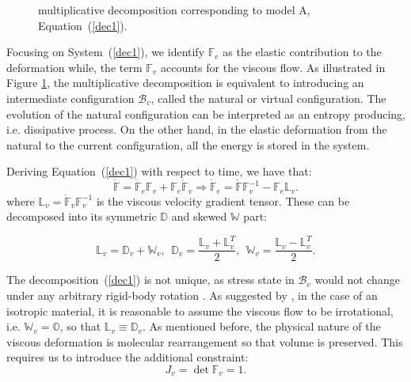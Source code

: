 \documentclass[runningheads]{llncs}
\newcommand{\F}{\ensuremath{\mathbb{F}}}
\newcommand{\LL}{\ensuremath{\mathbb{L}}}
\begin{document}
\begin{figure}[h!]
	\centering
	\hspace{20mm}
	\Large
	\def\svgwidth{0.5\linewidth}
	\caption{multiplicative decomposition corresponding to model A, Equation~(\ref{dec1}).}
\label{Model2}
\end{figure}

Focusing on System~(\ref{dec1}), we identify $\F_e$ as the elastic contribution to the deformation while, the term $\F_v$ accounts for the viscous flow. As illustrated in Figure \ref{Model2}, the multiplicative decomposition is equivalent to introducing an intermediate configuration $\mathcal{B}_v$, called the natural or virtual configuration. The evolution of the natural configuration can be interpreted as an entropy producing, i.e. dissipative process. On the other hand, in the elastic deformation from the natural to the current configuration, all the energy is stored in the system. 

Deriving Equation~(\ref{dec1}) with respect to time, we have that:
\begin{equation}
\dot{\F}=\dot{\F}_e\F_v+\F_e\dot{\F}_v \Longrightarrow \dot{\F}_e=\dot{\F}\F_v^{-1}-\F_e \LL_v. \label{lv}
\end{equation}
where $\LL_v=\dot{\F}_v\F_v^{-1}$ is the viscous velocity gradient tensor. These can be decomposed into its symmetric $\mathbb{D}$ and skewed $\mathbb{W}$ part:

\begin{equation}
\LL_v = \mathbb{D}_v + \mathbb{W}_v,  \ \ \mathbb{D}_v = \frac{\LL_v+\LL^T_v}{2}, \ \ \mathbb{W}_v = \frac{\LL_v-\LL^T_v}{2}.
\end{equation}

The decomposition~(\ref{dec1}) is not unique, as stress state in $\mathcal{B}_v$ would not change under any arbitrary rigid-body rotation \cite{multdec}. As suggested by \cite{Plasto}, in the case of an isotropic material, it is reasonable to assume the viscous flow to be irrotational, i.e. $\mathbb{W}_v=\mathbb{O}$, so that $\LL_v \equiv \mathbb{D}_v$.
As mentioned before, the physical nature of the viscous deformation is molecular rearrangement so that volume is preserved. This requires us to introduce the additional constraint:
\begin{equation}
J_v=\det \F_v= 1.\label{Jv}
\end{equation}


\end{document}
